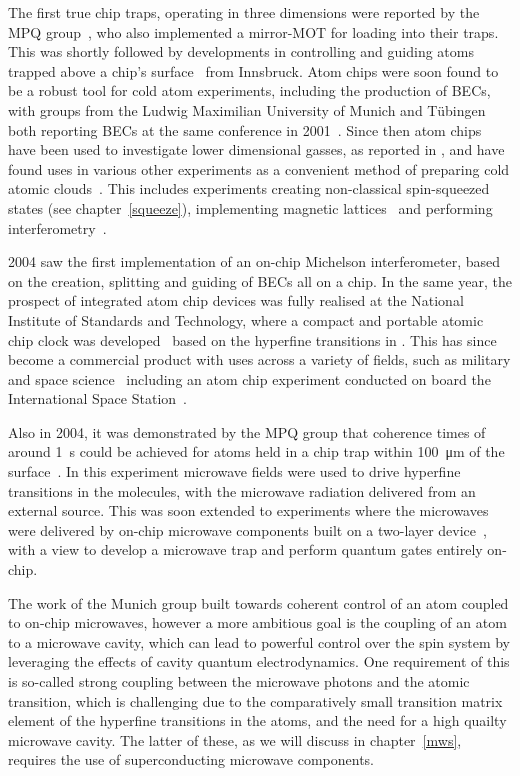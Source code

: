 The first true chip traps, operating in three dimensions were reported by the
MPQ group~\cite{Reichel1999}, who also implemented a mirror-MOT for loading
\esRb{} into their traps. This was shortly followed by developments in
controlling and guiding \Li{} atoms trapped above a chip's
surface~\cite{Folman2000} from Innsbruck.
%
Atom chips were soon found to be a robust tool for cold atom experiments,
including the production of BECs, with groups from the Ludwig Maximilian
University of Munich and T\"ubingen both reporting \esRb{} BECs at the same
conference in 2001~\cite{Hansel2001, Ott2001}. Since then atom chips have been
used to investigate lower dimensional gasses, as reported in
, and have found
uses in various other experiments as a convenient method of preparing cold
atomic clouds~\cite{PhysRevLett.104.073604}.
%
This includes experiments creating non-classical spin-squeezed states (see
chapter~\ref{squeeze}), implementing magnetic lattices~\cite{Gerritsma2007} and
performing interferometry~\cite{Wang2005}.

2004 saw the first implementation of an on-chip Michelson interferometer, based
on the creation, splitting and guiding of BECs all on a chip. In the same year,
the prospect of integrated atom chip devices was fully realised at the National
Institute of Standards and Technology, where a compact and portable atomic chip
clock was developed~\cite{Knappe2004} based on the hyperfine transitions in
\Cs{}. This has since become a commercial product with uses across a variety of
fields, such as military and space science~\cite{RAMIREZMARTINEZ2011247}
including an atom chip experiment conducted on board the International Space
Station~\cite{Frye2021}.

Also in 2004, it was demonstrated by the MPQ group that coherence times of
around \SI{1}{\second} could be achieved for \esRb{} atoms held in a chip trap
within \SI{100}{\micro\meter} of the surface~\cite{Treutlein2004}. In this
experiment microwave fields were used to drive hyperfine transitions in the
molecules, with the microwave radiation delivered from an external source. This
was soon extended to experiments where the microwaves were delivered by on-chip
microwave components built on a two-layer device~\cite{Treutlein2008,
Boehi2009}, with a view to develop a microwave trap and perform quantum
gates entirely on-chip.

The work of the Munich group built towards coherent control of an atom coupled
to on-chip microwaves, however a more ambitious goal is the coupling of an atom
to a microwave cavity, which can lead to powerful control over the spin system
by leveraging the effects of cavity quantum electrodynamics. One requirement of
this is so-called strong coupling between the microwave photons and the atomic
transition, which is challenging due to the comparatively small transition
matrix element of the hyperfine transitions in the atoms, and the need for a
high quailty microwave cavity. The latter of these, as we will discuss in
chapter~\ref{mws}, requires the use of superconducting microwave components.

